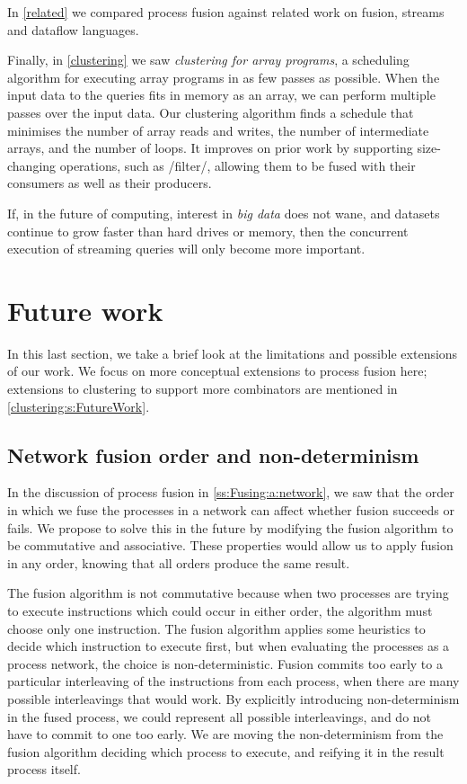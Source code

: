 In \cref{related} we compared process fusion against related work on fusion, streams and dataflow languages.

Finally, in \cref{clustering} we saw \emph{clustering for array programs}, a scheduling algorithm for executing array programs in as few passes as possible.
When the input data to the queries fits in memory as an array, we can perform multiple passes over the input data.
Our clustering algorithm finds a schedule that minimises the number of array reads and writes, the number of intermediate arrays, and the number of loops.
It improves on prior work by supporting size-changing operations, such as \Hs/filter/, allowing them to be fused with their consumers as well as their producers.

If, in the future of computing, interest in \emph{big data} does not wane, and datasets continue to grow faster than hard drives or memory, then the concurrent execution of streaming queries will only become more important.

\section{Future work}
\label{related/future}

In this last section, we take a brief look at the limitations and possible extensions of our work.
We focus on more conceptual extensions to process fusion here; extensions to clustering to support more combinators are mentioned in \cref{clustering:s:FutureWork}.

\subsection{Network fusion order and non-determinism}

In the discussion of process fusion in \cref{ss:Fusing:a:network}, we saw that the order in which we fuse the processes in a network can affect whether fusion succeeds or fails.
We propose to solve this in the future by modifying the fusion algorithm to be commutative and associative.
These properties would allow us to apply fusion in any order, knowing that all orders produce the same result.

The fusion algorithm is not commutative because when two processes are trying to execute instructions which could occur in either order, the algorithm must choose only one instruction.
The fusion algorithm applies some heuristics to decide which instruction to execute first, but when evaluating the processes as a process network, the choice is non-deterministic.
Fusion commits too early to a particular interleaving of the instructions from each process, when there are many possible interleavings that would work.
By explicitly introducing non-determinism in the fused process, we could represent all possible interleavings, and do not have to commit to one too early.
We are moving the non-determinism from the fusion algorithm deciding which process to execute, and reifying it in the result process itself.

